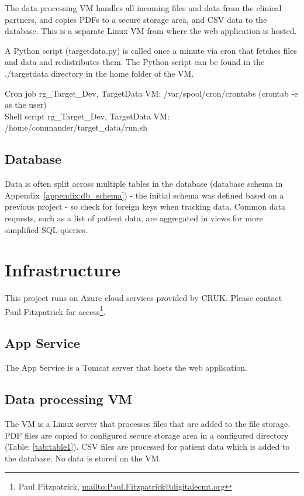 \documentclass[10pt,a4paper,oneside]{article}
\begin{document}
	The data processing VM handles all incoming files and data from the clinical partners, and copies PDFs to a secure storage area, 
	and CSV data to the database. This is a separate Linux VM from where the web application is hosted. 
	
	A Python script (targetdata.py) is called once a minute via cron that fetches files and data and redistributes them. 
	The Python script can be found in the ./targetdata directory in the home folder of the VM.
	
	Cron job rg\_Target\_Dev, TargetData VM: /var/spool/cron/crontabs (crontab -e as the user)\\
	Shell script rg\_Target\_Dev, TargetData VM: /home/commander/target\_data/\allowbreak run.sh
	
	\subsection{Database}
	
	Data is often split across multiple tables in the database (database schema in Appendix~\ref{appendix:db_schema}) - 
	the initial schema was defined based on a previous project - so check for foreign keys when tracking data. Common data requests, 
	such as a list of patient data, are aggregated in views for more simplified SQL queries.

\section{Infrastructure}
	This project runs on Azure cloud services provided by CRUK. Please contact Paul Fitzpatrick for access\footnote{Paul Fitzpatrick, \url{mailto:Paul.Fitzpatrick@digitalecmt.org}}.
	
	\subsection{App Service}
	
	The App Service is a Tomcat server that hosts the web application.
	
	\subsection{Data processing VM}
	
	The VM is a Linux server that processes files that are added to the file storage. 
	PDF files are copied to configured secure storage area in a configured directory (Table: \ref{tab:table1}). CSV files are processed for patient 
	data which is added to the database. No data is stored on the VM.
	
\end{document}
